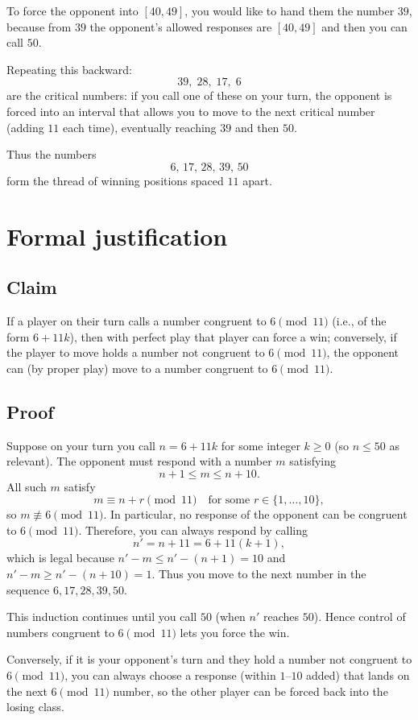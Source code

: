 \documentclass[11pt]{article}
\begin{document}
To force the opponent into $[40,49]$, you would like to hand them the number $39$, because from $39$ the opponent's allowed responses are $[40,49]$ and then you can call $50$.

Repeating this backward:
\[
39,\; 28,\; 17,\; 6
\]
are the critical numbers: if you call one of these on your turn, the opponent is forced into an interval that allows you to move to the next critical number (adding $11$ each time), eventually reaching $39$ and then $50$.

Thus the numbers
\[
6,\, 17,\, 28,\, 39,\, 50
\]
form the thread of winning positions spaced $11$ apart.

\section*{Formal justification}

\subsection*{Claim}
If a player on their turn calls a number congruent to $6\pmod{11}$ (i.e., of the form $6+11k$), then with perfect play that player can force a win; conversely, if the player to move holds a number not congruent to $6\pmod{11}$, the opponent can (by proper play) move to a number congruent to $6\pmod{11}$.

\subsection*{Proof}
Suppose on your turn you call $n = 6 + 11k$ for some integer $k\ge 0$ (so $n\le 50$ as relevant). The opponent must respond with a number $m$ satisfying
\[
n+1 \le m \le n+10.
\]
All such $m$ satisfy
\[
m \equiv n + r \pmod{11} \quad\text{for some } r\in\{1,\dots,10\},
\]
so $m \not\equiv 6 \pmod{11}$. In particular, no response of the opponent can be congruent to $6\pmod{11}$. Therefore, you can always respond by calling
\[
n' = n + 11 = 6 + 11(k+1),
\]
which is legal because $n' - m \le n' - (n+1) = 10$ and $n' - m \ge n' - (n+10) = 1$. Thus you move to the next number in the sequence $6,17,28,39,50$.

This induction continues until you call $50$ (when $n'$ reaches $50$). Hence control of numbers congruent to $6\pmod{11}$ lets you force the win.

Conversely, if it is your opponent's turn and they hold a number not congruent to $6\pmod{11}$, you can always choose a response (within $1$--$10$ added) that lands on the next $6\pmod{11}$ number, so the other player can be forced back into the losing class.
\end{document}
